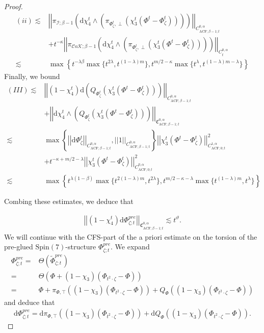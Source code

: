 \documentclass[psamsfonts]{amsart}
\theoremstyle{plain}
\theoremstyle{definition}{
\newtheorem{defi}{Definition}[section]
\newtheorem{ass}{Assumption}
\newtheorem*{nota}{Notation}}
\theoremstyle{remark}{
\newtheorem{rem}{Remark}
\newtheorem{ex}{Example}}
\theoremstyle{plain}{
\newtheorem{thm}{Theorem}[section]
\newtheorem{lem}{Lemma}[section]
\newtheorem{cor}{Corollary}[section]
\newtheorem{prop}{Proposition}[section]
\newtheorem{con}{Conjecture}[section]}
\newcommand{\m}[1]{{\mathrm{#1}}}
\begin{document}
\begin{proof}
\begin{align*}
    (ii)\lesssim&\left|\left|\pi_{\mathcal{I};\beta-1}\left(\m{d}\chi^t_4\wedge\left(\pi_{\Phi^t_\zeta,\perp}\left(\chi^t_3(\Phi^t-\Phi^t_\zeta)\right)\right)\right)\right|\right|_{C^{0,\alpha}_{\m{ACF};\beta-1;t}}\\
    &+t^{-\kappa}\left|\left|\pi_{\mathcal{C}o\mathcal{K};\beta-1}\left(\m{d}\chi^t_4\wedge\left(\pi_{\Phi^t_\zeta,\perp}\left(\chi^t_3(\Phi^t-\Phi^t_\zeta)\right)\right)\right)\right|\right|_{C^{0,\alpha}_{t}}\\
    \lesssim& \max\left\{t^{-\lambda\beta}\max\{t^{2\lambda},t^{(1-\lambda)m}\},t^{m/2-\kappa}\max\{t^\lambda,t^{(1-\lambda)m-\lambda}\}\right\}
\end{align*}
Finally, we bound 
\begin{align*}
    (III)\lesssim&\left|\left|(1-\chi^t_4)\m{d}\left(Q_{\Phi^t_\zeta}\left(\chi^t_3(\Phi^t-\Phi^t_\zeta)\right)\right)\right|\right|_{C^{0,\alpha}_{\m{ACF};\beta-1;t}}\\
    &+\left|\left|\m{d}\chi^t_4\wedge\left(Q_{\Phi^t_\zeta}\left(\chi^t_3(\Phi^t-\Phi^t_\zeta)\right)\right)\right|\right|_{\mathfrak{C}^{0,\alpha}_{\m{ACF};\beta-1;t}}\\
    \lesssim&\max\left\{\left|\left|\m{d}\Phi^t_\zeta\right|\right|_{C^{0,\alpha}_{\m{ACF};\beta-1;t}},\left|\left|1\right|\right|_{C^{0,\alpha}_{\m{ACF};\beta-1;t}}\right\}\left|\left|\chi^t_3(\Phi^t-\Phi^t_\zeta)\right|\right|_{C^{1,\alpha}_{\m{ACF};0;t}}^2\\
    &+t^{-\kappa+m/2-\lambda}\left|\left|\chi^t_3(\Phi^t-\Phi^t_\zeta)\right|\right|_{C^{0,\alpha}_{\m{ACF};0;t}}^2\\
    \lesssim&\max\left\{t^{\lambda(1-\beta)}\max\{t^{2(1-\lambda)m},t^{2\lambda}\},t^{m/2-\kappa-\lambda}\max\{t^{(1-\lambda)m},t^{\lambda}\}\right\}
\end{align*}



Combing these estimates, we deduce that 

\begin{align*}
    \left|\left|(1-\chi^t_4)\m{d}\Phi^{pre}_{\zeta;t}\right|\right|_{\mathfrak{C}^{0,\alpha}_{\m{ACF};\beta-1;t}}\lesssim t^\vartheta.
\end{align*}
We will continue with the CFS-part of the a priori estimate on the torsion of the pre-glued $\m{Spin}(7)$-structure $\Phi^{pre}_{\zeta;t}$. We expand 
\begin{align*}
    \Phi^{pre}_{\zeta;t}=&\Theta(\widetilde{\Phi}^{pre}_{\zeta;t})\\
    =&\Theta(\Phi+(1-\chi_3)(\Phi_{t^2\cdot\zeta}-\Phi))\\
    =&\Phi+\pi_{\Phi,\top}\left((1-\chi_3)(\Phi_{t^2\cdot\zeta}-\Phi)\right)+Q_{\Phi}\left((1-\chi_3)(\Phi_{t^2\cdot\zeta}-\Phi)\right)
\end{align*}
and deduce that 
\begin{align*}
    \m{d}\Phi^{pre}_{\zeta;t}=\m{d}\pi_{\Phi,\top}\left((1-\chi_3)(\Phi_{t^2\cdot\zeta}-\Phi)\right)+\m{d}Q_{\Phi}\left((1-\chi_3)(\Phi_{t^2\cdot\zeta}-\Phi)\right).
\end{align*}



\end{proof}
\end{document}

